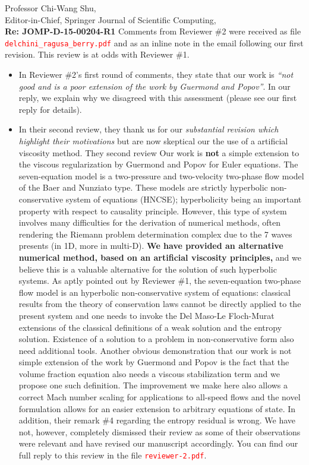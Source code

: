 \documentclass[11pt]{letter}
\newcommand{\tcr}[1]{\textcolor{red}{#1}}
\begin{document}
\begin{letter}{Professor Chi-Wang Shu, \\  Editor-in-Chief, Springer Journal of Scientific Computing,\\
\textbf{Re: JOMP-D-15-00204-R1}}
Comments from Reviewer \#2 were received as file \tcr{{\tt delchini\_ragusa\_berry.pdf}}
and as an inline note in the email following our first revision. This review is at odds with Reviewer \#1.
\begin{itemize}
\item 
In Reviewer \#2's first round of comments, 
they state that our work is {\it ``not good and is a poor extension of the work by Guermond and Popov''}. In our reply, we explain why we disagreed with this assessment (please see our first reply for details). 
\item In their second review, they thank us for our {\it substantial revision which highlight their motivations} but are now skeptical our the use of a artificial viscosity method.  They second review 
%
Our work is {\bf not} a simple extension to the viscous regularization by Guermond and Popov for Euler equations. 
The seven-equation model is a two-pressure and two-velocity
two-phase flow model of the Baer and Nunziato type. These models are strictly hyperbolic 
non-conservative system of equations (HNCSE); hyperbolicity being an important property with respect to
causality principle. However, this type of system involves many difficulties 
for the derivation of numerical methods, often rendering the Riemann problem determination complex due 
to the 7 waves presents (in 1D, more in multi-D).  {\bf We have provided an alternative 
numerical method, based on an artificial viscosity principles,} and we believe this is a valuable alternative for the
solution of such hyperbolic systems.
As aptly pointed out by Reviewer \#1, the seven-equation two-phase flow model is an hyperbolic non-conservative 
system of equations: classical results from the theory of conservation laws cannot be directly
applied to the present system and one needs to invoke the Del Maso-Le Floch-Murat extensions of the 
classical definitions of a weak solution and the entropy solution. Existence of a solution to
a problem in non-conservative form also need additional tools. Another obvious demonstration that our
work is not simple extension of the work by Guermond and Popov is the fact that the volume fraction equation
also needs a  viscous stabilization term and we propose one such definition. 
%
The improvement we make here also allows a correct Mach number scaling for applications to all-speed flows and
the novel formulation allows for an easier extension to arbitrary equations of state.
In addition, their remark \#4 regarding the entropy residual is wrong. 
We have not, however, completely dismissed their review as some of their observations were relevant and have revised
our manuscript accordingly. You can find our full reply to this review in the file \tcr{{\tt reviewer-2.pdf}}.


\end{itemize}
\end{letter}
\end{document}
